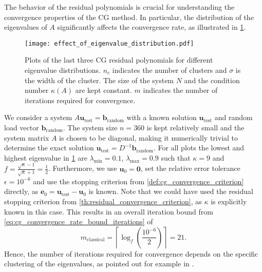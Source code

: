 The behavior of the residual polynomials is crucial for understanding the convergence properties of the CG method. In particular, the distribution of the eigenvalues of $A$ significantly affects the convergence rate, as illustrated in \cref{fig:cg_effect_of_eigenvalue_distribution}. 
\begin{figure}[H]
  \centering
  \texttt{[image: effect\_of\_eigenvalue\_distribution.pdf]}
  \caption{Plots of the last three CG residual polynomials for different eigenvalue distributions. $n_c$ indicates the number of clusters and $\sigma$ is the width of the cluster. The size of the system $N$ and the condition number $\kappa(A)$ are kept constant. $m$ indicates the number of iterations required for convergence.}
  \label{fig:cg_effect_of_eigenvalue_distribution}
\end{figure}
We consider a system $A\mathbf{u}_{\text{test}} = \mathbf{b}_{\text{random}}$ with a known solution $\mathbf{u}_{\text{test}}$ and random load vector $\mathbf{b}_{\text{random}}$. The system size $n=360$ is kept relatively small and the system matrix $A$ is chosen to be diagonal, making it numerically trivial to determine the exact solution $\mathbf{u}_{\text{test}} = D^{-1}\mathbf{b}_{\text{random}}$. For all plots the lowest and highest eigenvalue in \cref{fig:cg_effect_of_eigenvalue_distribution} are $\lambda_{\text{min}} = 0.1$, $\lambda_{\text{max}} = 0.9$ such that $\kappa = 9$ and $f = \frac{\sqrt{\kappa} - 1}{\sqrt{\kappa} + 1} = \frac{1}{2}$. Furthermore, we use $\mathbf{u}_{0} = \mathbf{0}$, set the relative error tolerance $\epsilon = 10^{-6}$ and use the stopping criterion from \cref{def:cg_convergence_criterion} directly, as $\mathbf{e}_0 = \mathbf{u}_{\text{test}} - \mathbf{u}_{0}$ is known. Note that we could have used the residual stopping criterion from \cref{th:residual_convergence_criterion}, as $\kappa$ is explicitly known in this case. This results in an overall iteration bound from \cref{eq:cg_convergence_rate_bound_iterations} of
\[
    m_{\text{classical}} = \left\lceil\log_f\left(\frac{10^{-6}}{2}\right)\right\rceil = 21.
\]
Hence, the number of iterations required for convergence depends on the specific clustering of the eigenvalues, as pointed out for example in \cite[Section 2.3]{nonlinear_cg_Kelley_1995}.

